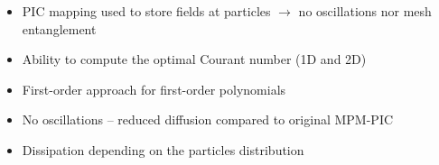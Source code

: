 \documentclass[11pt,aspectratio=169]{beamer}
\newcommand{\footnoteCite}[1]{
  {\tiny 
  \begin{flushleft}
    \foreach \x in {#1}{\cite{\x}  \fullcite{\x}\\}
  \end{flushleft}
}
}
\begin{document}
\begin{frame}[standout]
\begin{scriptsize}
\begin{overprint}
\begin{block}{}
\begin{itemize}
\begin{itemize}
          \end{itemize}
        \item PIC mapping used to store fields at particles $\rightarrow$ no oscillations nor mesh entanglement
        \end{itemize}
      \end{block}
      \begin{block}{}
      \vskip -6pt
        \begin{itemize}
        \item Ability to compute the optimal Courant number (1D and 2D) \cite{DGMPM_stab}
        \item First-order approach for first-order polynomials
        \end{itemize}
      \end{block}
      \begin{block}{}
      \vskip -6pt
        \begin{itemize}
        \item No oscillations -- reduced diffusion compared to original MPM-PIC
        \item Dissipation depending on the particles distribution
        \end{itemize}
      \end{block}
    \end{overprint}
    
  \end{scriptsize}
  
\end{frame}
\end{document}
